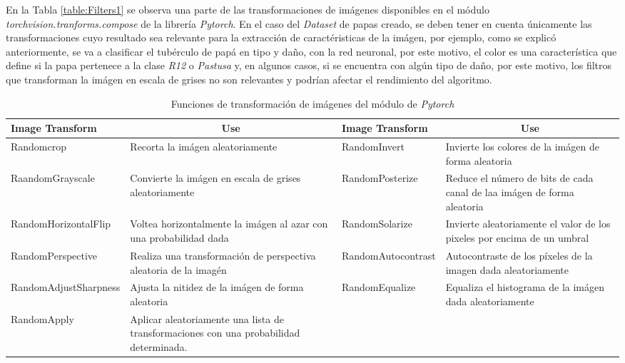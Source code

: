 			En la Tabla \ref{table:Filters1} se observa una parte de las transformaciones de imágenes disponibles en el módulo \textit{torchvision.tranforms.compose} de la librería \textit{Pytorch}. En el caso del \textit{Dataset} de papas creado, se deben tener en cuenta únicamente las transformaciones cuyo resultado sea relevante para la extracción de caractéristicas de la imágen, por ejemplo, como se explicó anteriormente, se va a clasificar el tubérculo de papá en tipo y daño, con la red neuronal, por este motivo, el color es una característica que define si la papa pertenece a la clase \textit{R12} o \textit{Pastusa} y, en algunos casos, si se encuentra con algún tipo de daño, por este motivo, los filtros que transforman la imágen en escala de grises no son relevantes y podrían afectar el rendimiento del algoritmo.
		
			\begin{table}[ht]
				\centering
				\begin{tabular}{|p{4.5cm}|p{3.5cm}|p{3.8cm}|p{3.5cm}|}
					\hline
					Image Transform       & \multicolumn{1}{c|}{Use}                                                               & Image Transform       & \multicolumn{1}{c|}{Use}                                                \\ \hline
					Randomcrop            & Recorta la imágen aleatoriamente                                                       & RandomInvert          & Invierte los colores de la imágen de forma aleatoria                    \\ \hline
					RaandomGrayscale      & Convierte la imágen en escala de grises aleatoriamente                                 & RandomPosterize       & Reduce el número de bits de cada canal de laa imágen de forma aleatoria \\ \hline
					RandomHorizontalFlip  & Voltea horizontalmente la imágen al azar con una probabilidad dada                     & RandomSolarize        & Invierte aleatoriamente el valor de los pixeles por encima de un umbral \\ \hline
					RandomPerspective     & Realiza una transformación de perspectiva aleatoria de la imagén                       & RandomAutocontrast    & Autocontraste de los píxeles de la imagen dada aleatoriamente           \\ \hline
					RandomAdjustSharpness & Ajusta la nitidez de la imágen de forma aleatoria                                      & RandomEqualize        & Equaliza el histograma de la imágen dada aleatoriamente                 \\ \hline
					RandomApply           & Aplicar aleatoriamente una lista de transformaciones con una probabilidad determinada. & \multicolumn{1}{l|}{} &                                                                         \\ \hline
				\end{tabular}
				\label{table:filters2}
				\caption{Funciones de transformación de imágenes del módulo de \textit{Pytorch}}
			\end{table}

